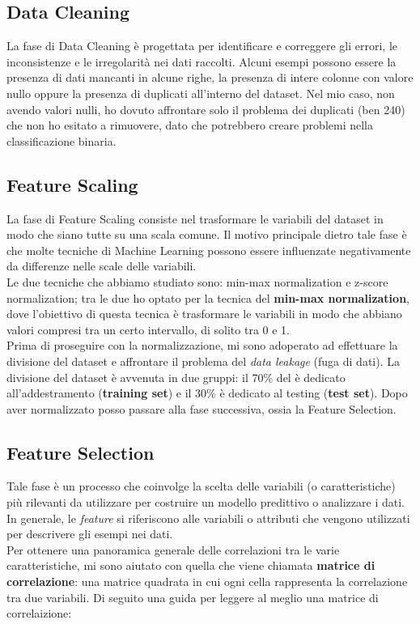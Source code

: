 \documentclass{article}
\begin{document}
\begin{titlepage}
        \subsection{Data Cleaning}
        La fase di Data Cleaning  è progettata per identificare e correggere gli errori, le inconsistenze e le irregolarità nei dati raccolti. Alcuni esempi possono essere la presenza di dati mancanti in alcune righe, la presenza di intere colonne con valore nullo oppure la presenza di duplicati all'interno del dataset. Nel mio caso, non avendo valori nulli, ho dovuto affrontare solo il problema dei duplicati (ben 240) che non ho esitato a rimuovere, dato che potrebbero creare problemi nella classificazione binaria. 

        \newpage
        \subsection{Feature Scaling}
        La fase di Feature Scaling consiste nel trasformare le variabili del dataset in modo che siano tutte su una scala comune. Il motivo principale dietro tale fase è che molte tecniche di Machine Learning possono essere influenzate negativamente da differenze nelle scale delle variabili. \\Le due tecniche che abbiamo studiato sono: min-max normalization e z-score normalization; tra le due ho optato per la tecnica del \textbf{min-max normalization}, dove l'obiettivo di questa tecnica è trasformare le variabili in modo che abbiano valori compresi tra un certo intervallo, di solito tra 0 e 1. \\Prima di proseguire con la normalizzazione, mi sono adoperato ad effettuare la divisione del dataset e affrontare il problema del \textit{data leakage} (fuga di dati). La divisione del dataset è avvenuta in due gruppi: il 70\% del è dedicato all'addestramento (\textbf{training set}) e il 30\% è dedicato al testing (\textbf{test set}).
        Dopo aver normalizzato posso passare alla fase successiva, ossia la Feature Selection.

        \subsection{Feature Selection}
        Tale fase è un processo che coinvolge la scelta delle variabili (o caratteristiche) più rilevanti da utilizzare per costruire un modello predittivo o analizzare i dati. In generale, le \textit{feature} si riferiscono alle variabili o attributi che vengono utilizzati per descrivere gli esempi nei dati. \\
        Per ottenere una panoramica generale delle correlazioni tra le varie caratteristiche, mi sono aiutato con quella che viene chiamata \textbf{matrice di correlazione}: una matrice quadrata in cui ogni cella rappresenta la correlazione tra due variabili. Di seguito una guida per leggere al meglio una matrice di correlaizione:
        

\end{titlepage}
\end{document}
